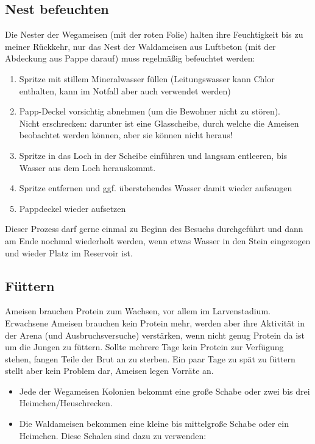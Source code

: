 \subsection{Nest befeuchten}\label{sec:Ameisen_sub:Befeuchten}
Die Nester der Wegameisen (mit der roten Folie) halten ihre Feuchtigkeit bis zu meiner Rückkehr,
nur das Nest der Waldameisen aus Luftbeton (mit der Abdeckung aus Pappe darauf) muss regelmäßig befeuchtet werden:
\begin{enumerate}
  \item Spritze mit stillem Mineralwasser füllen
        (Leitungswasser kann Chlor enthalten, kann im Notfall aber auch verwendet werden)
  \item Papp-Deckel vorsichtig abnehmen (um die Bewohner nicht zu stören).\\
        Nicht erschrecken: darunter ist eine Glasscheibe, durch welche die Ameisen beobachtet werden können, aber sie können nicht heraus!
  \item Spritze in das Loch in der Scheibe einführen und langsam entleeren, bis Wasser aus dem Loch herauskommt.
  \item Spritze entfernen und ggf. überstehendes Wasser damit wieder aufsaugen
  \item Pappdeckel wieder aufsetzen
\end{enumerate}
Dieser Prozess darf gerne einmal zu Beginn des Besuchs durchgeführt und dann am Ende nochmal wiederholt werden,
wenn etwas Wasser in den Stein eingezogen und wieder Platz im Reservoir ist.

\subsection{Füttern}\label{sec:Ameisen_sub:Fuettern}
Ameisen brauchen Protein zum Wachsen, vor allem im Larvenstadium.
Erwachsene Ameisen brauchen kein Protein mehr, werden aber ihre Aktivität in der Arena
(und Ausbruchsversuche) verstärken, wenn nicht genug Protein da ist um die Jungen zu füttern.
Sollte mehrere Tage kein Protein zur Verfügung stehen, fangen Teile der Brut an zu sterben.
Ein paar Tage zu spät zu füttern stellt aber kein Problem dar, Ameisen legen Vorräte an.

\begin{itemize}
  \item Jede der Wegameisen Kolonien bekommt eine große Schabe
        oder zwei bis drei Heimchen/Heuschrecken.
  \item Die Waldameisen bekommen eine kleine bis mittelgroße Schabe oder ein Heimchen.
        Diese Schalen sind dazu zu verwenden:
\end{itemize}


